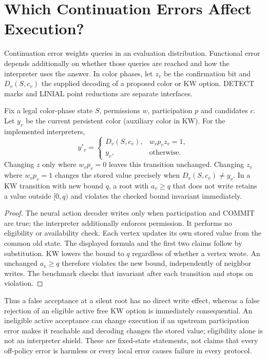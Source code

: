 \section{Which Continuation Errors Affect Execution?}\label{sec:relevance}
Continuation error weights queries in an evaluation distribution. Functional
error depends additionally on whether those queries are reached and how the
interpreter uses the answer. In color phases, let $z_v$ be the confirmation
bit and $D_v(S,c_v)$ the supplied decoding of a proposed color or KW option.
DETECT marks and LINIAL point reductions are separate interfaces.

\begin{proposition}\label{prop:relevance}
Fix a legal color-phase state $S$, permissions $w$, participation $p$ and
candidates $c$. Let $y_v$ be the current persistent color (auxiliary color
in KW). For the implemented interpreters,
\[
 y'_v=\begin{cases}D_v(S,c_v),&w_vp_vz_v=1,\\y_v,&\text{otherwise}.\end{cases}
\]
Changing $z$ only where $w_vp_v=0$ leaves this transition unchanged.
Changing $z_v$ where $w_vp_v=1$ changes the stored value precisely when
$D_v(S,c_v)\ne y_v$. In a KW transition with new bound $q$, a root with
$a_v\ge q$ that does not write retains a value outside $[0,q)$ and violates
the checked bound invariant immediately.
\end{proposition}
\begin{proof}
The neural action decoder writes only when participation and COMMIT are
true; the interpreter additionally enforces permission. It performs no
eligibility or availability check. Each vertex updates its own stored
value from the common old state. The displayed formula and the first two
claims follow by substitution. KW lowers the bound to $q$ regardless of
whether a vertex wrote. An unchanged $a_v\ge q$ therefore violates the new
bound, independently of neighbor writes. The benchmark checks that invariant
after each transition and stops on violation.
\end{proof}
Thus a false acceptance at a silent root has no direct write effect, whereas
a false rejection of an eligible active free KW option is immediately
consequential. An ineligible active acceptance can change execution if an upstream
participation error makes it reachable and decoding changes the stored value;
eligibility alone is not an interpreter shield. These are fixed-state statements, not claims that every off-policy
error is harmless or every local error causes failure in every protocol.

